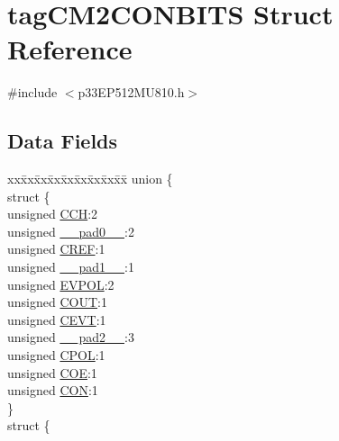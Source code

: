 \hypertarget{structtag_c_m2_c_o_n_b_i_t_s}{}\section{tag\+C\+M2\+C\+O\+N\+B\+I\+TS Struct Reference}
\label{structtag_c_m2_c_o_n_b_i_t_s}


{\ttfamily \#include $<$p33\+E\+P512\+M\+U810.\+h$>$}

\subsection*{Data Fields}
\begin{DoxyCompactItemize}
\item 
\begin{tabbing}
xx\=xx\=xx\=xx\=xx\=xx\=xx\=xx\=xx\=\kill
union \{\\
\>struct \{\\
\>\>unsigned \hyperlink{structtag_c_m2_c_o_n_b_i_t_s_af6a2b157b0f71dea8f43c91f28d471fa}{CCH}:2\\
\>\>unsigned \hyperlink{structtag_c_m2_c_o_n_b_i_t_s_adf71f3d8410c1f1dbbc96680a92c49af}{\_\_pad0\_\_}:2\\
\>\>unsigned \hyperlink{structtag_c_m2_c_o_n_b_i_t_s_a9048d78086e7f5418dbc9fecb8919d03}{CREF}:1\\
\>\>unsigned \hyperlink{structtag_c_m2_c_o_n_b_i_t_s_acaf2d0924a107ec6e8d2e31febaf66f9}{\_\_pad1\_\_}:1\\
\>\>unsigned \hyperlink{structtag_c_m2_c_o_n_b_i_t_s_a22ccc87578ee3feb3e930e91cb3aabde}{EVPOL}:2\\
\>\>unsigned \hyperlink{structtag_c_m2_c_o_n_b_i_t_s_acc4589f929da98d8dbb0e6471091a261}{COUT}:1\\
\>\>unsigned \hyperlink{structtag_c_m2_c_o_n_b_i_t_s_aa7004514fee8eae1195cde3df03f2325}{CEVT}:1\\
\>\>unsigned \hyperlink{structtag_c_m2_c_o_n_b_i_t_s_a4d97cc5f7d51d22fc2bf3eab35c9cb7f}{\_\_pad2\_\_}:3\\
\>\>unsigned \hyperlink{structtag_c_m2_c_o_n_b_i_t_s_a04811054048ff377eded5449c6bdf534}{CPOL}:1\\
\>\>unsigned \hyperlink{structtag_c_m2_c_o_n_b_i_t_s_ad11255870fadb4e9c1faac4645267702}{COE}:1\\
\>\>unsigned \hyperlink{structtag_c_m2_c_o_n_b_i_t_s_a92ce9acc6bbe01ff104c2c8f55101852}{CON}:1\\
\>\} \\
\>struct \{\\

\end{tabbing}
\end{DoxyCompactItemize}
